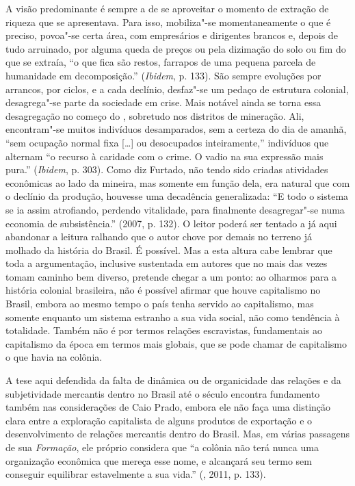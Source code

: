 A visão predominante é sempre a de se aproveitar o momento de extração
de riqueza que se apresentava. Para isso, mobiliza"-se momentaneamente
o que é preciso, povoa"-se certa área, com empresários e dirigentes
brancos e, depois de tudo arruinado, por alguma queda de preços ou pela
dizimação do solo ou fim do que se extraía, ``o que fica são restos,
farrapos de uma pequena parcela de humanidade em decomposição.''
(\emph{Ibidem}, p. 133). São sempre evoluções por arrancos, por ciclos,
e a cada declínio, desfaz"-se um pedaço de estrutura colonial,
desagrega"-se parte da sociedade em crise. Mais notável ainda se torna
essa desagregação no começo do , sobretudo nos distritos de
mineração. Ali, encontram"-se muitos indivíduos desamparados, sem a
certeza do dia de amanhã, ``sem ocupação normal fixa [\ldots{}] ou
desocupados inteiramente,'' indivíduos que alternam ``o recurso à
caridade com o crime. O vadio na sua expressão mais pura.''
(\emph{Ibidem}, p. 303). Como diz Furtado, não tendo sido criadas
atividades econômicas ao lado da mineira, mas somente em função dela,
era natural que com o declínio da produção, houvesse uma decadência
generalizada: ``E todo o sistema se ia assim atrofiando, perdendo
vitalidade, para finalmente desagregar"-se numa economia de
subsistência.'' (2007, p. 132). O leitor poderá ser tentado a já
aqui abandonar a leitura ralhando que o autor chove por demais no
terreno já molhado da história do Brasil. É possível. Mas a esta
altura cabe lembrar que toda a argumentação, inclusive sustentada
em autores que no mais das vezes tomam caminho bem diverso, pretende
chegar a um ponto: ao olharmos para a história colonial brasileira,
não é possível afirmar que houve capitalismo no Brasil, embora ao
mesmo tempo o país tenha servido ao capitalismo, mas somente enquanto
um sistema estranho a sua vida social, não como tendência à totalidade.
Também não é por termos relações escravistas, fundamentais ao
capitalismo da época em termos mais globais, que se pode chamar de
capitalismo o que havia na colônia.

A tese aqui defendida da falta de dinâmica ou de organicidade das
relações e da subjetividade mercantis dentro no Brasil até o século 
encontra fundamento também nas considerações de Caio Prado, embora ele
não faça uma distinção clara entre a exploração capitalista de alguns
produtos de exportação e o desenvolvimento de relações mercantis dentro
do Brasil. Mas, em várias passagens de sua \emph{Formação}, ele próprio
considera que ``a colônia não terá nunca uma organização econômica que
mereça esse nome, e alcançará seu termo sem conseguir equilibrar
estavelmente a sua vida.'' (, 2011, p. 133).

